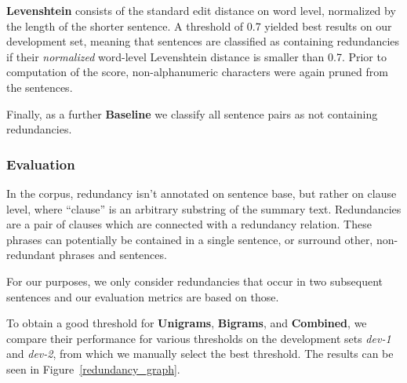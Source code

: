 \documentclass[a4paper,10pt]{scrartcl}
\theoremstyle{style}
\begin{document}
\textbf{Levenshtein} consists of the standard edit distance \citep{levenshtein1966binary} on word level, normalized by the length of the shorter sentence. A threshold of 0.7 yielded best results on our development set, meaning that sentences are classified as containing redundancies if their \textit{normalized} word-level Levenshtein distance is smaller than 0.7. Prior to computation of the score, non-alphanumeric characters were again pruned from the sentences.

Finally, as a further \textbf{Baseline} we classify all sentence pairs as not containing redundancies.

\subsubsection{Evaluation}

In the corpus, redundancy isn't annotated on sentence base, but rather on clause level, where ``clause'' is an arbitrary substring of the summary text. Redundancies are a pair of clauses which are connected with a redundancy relation.
These phrases can potentially be contained in a single sentence, or surround other, non-redundant phrases and sentences.

For our purposes, we only consider redundancies that occur in two subsequent sentences and our evaluation metrics are based on those.

To obtain a good threshold for \textbf{Unigrams}, \textbf{Bigrams}, and \textbf{Combined}, we compare their performance for various thresholds on the development sets \textit{dev-1} and \textit{dev-2}, from which we manually select the best threshold. The results can be seen in Figure~\ref{redundancy_graph}.
\end{document}
